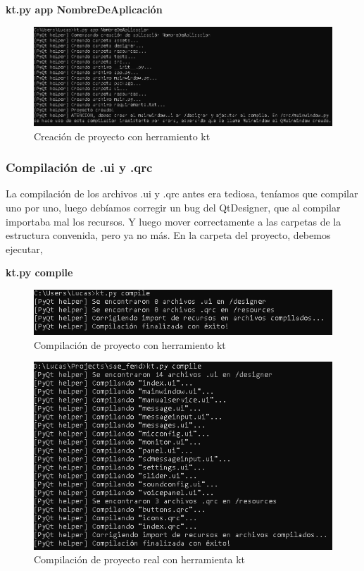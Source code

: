 \begin{center}
    \textbf{kt.py app NombreDeAplicaci\'on}
\end{center}

\begin{figure}[H]
    \centering
    \includegraphics[width=0.9\linewidth]{imagenes/kt/app.png}
    \caption{Creaci\'on de proyecto con herramiento kt}
    \label{fig:creacion_app_kt}
\end{figure}

\subsubsection{Compilaci\'on de .ui y .qrc}
La compilaci\'on de los archivos .ui y .qrc antes era tediosa, ten\'iamos que compilar uno por uno, luego deb\'iamos
corregir un bug del QtDesigner, que al compilar importaba mal los recursos. Y luego mover correctamente a las carpetas de la estructura convenida,
pero ya no m\'as. En la carpeta del proyecto, debemos ejecutar,

\begin{center}
    \textbf{kt.py compile}
\end{center}

\begin{figure}[H]
    \centering
    \includegraphics[width=0.9\linewidth]{imagenes/kt/compile.png}
    \caption{Compilaci\'on de proyecto con herramiento kt}
    \label{fig:compilacion_kt}
\end{figure}

\begin{figure}[H]
    \centering
    \includegraphics[width=0.9\linewidth]{imagenes/kt/muestra.png}
    \caption{Compilaci\'on de proyecto real con herramienta kt}
    \label{fig:muestra_compilacion_kt}
\end{figure}